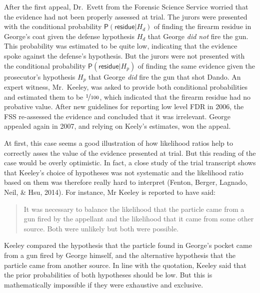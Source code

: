 \documentclass[
  10pt,
  dvipsnames,enabledeprecatedfontcommands]{scrartcl}
\newcommand{\pr}[1]{\mathsf{P}(#1)}
\begin{document}
After the first appeal, Dr.~Evett from the Forensic Science Service
worried that the evidence had not been properly assessed at trial. The
jurors were presented with the conditional probability
\(\pr{\textsf{residue}\vert H_d}\) of finding the firearm residue in
George's coat given the defense hypothesis \(H_d\) that George
\textit{did not} fire the gun. This probability was estimated to be
quite low, indicating that the evidence spoke against the defense's
hypothesis. But the jurors were not presented with the conditional
probability \(\pr{\textsf{residue}\vert H_p}\) of finding the same
evidence given the prosecutor's hypothesis \(H_p\) that George
\textit{did} fire the gun that shot Dando. An expert witness,
Mr.~Keeley, was asked to provide both conditional probabilities and
estimated them to be \(\nicefrac{1}{100}\), which indicated that the
firearm residue had no probative value. After new guidelines for
reporting low level FDR in 2006, the FSS re-assessed the evidence and
concluded that it was irrelevant. George appealed again in 2007, and
relying on Keely's estimates, won the appeal.

At first, this case seems a good illustration of how likelihood ratios
help to correctly asses the value of the evidence presented at trial.
But this reading of the case would be overly optimistic. In fact, a
close study of the trial transcript shows that Keeley's choice of
hypotheses was not systematic and the likelihood ratio based on them was
therefore really hard to interpret (Fenton, Berger, Lagnado, Neil, \&
Hsu, 2014). For instance, Mr Keeley is reported to have said:

\begin{quote}
    It was necessary to balance the likelihood that the particle came from a gun fired by the appellant and the likelihood that it came from some other source. Both were unlikely but both were possible.
\end{quote}

\noindent  Keeley compared the hypothesis that the particle found in
George's pocket came from a gun fired by George himself, and the
alternative hypothesis that the particle came from another source. In
line with the quotation, Keeley said that the prior probabilities of
both hypotheses should be low. But this is mathematically impossible if
they were exhaustive and exclusive.
\end{document}
